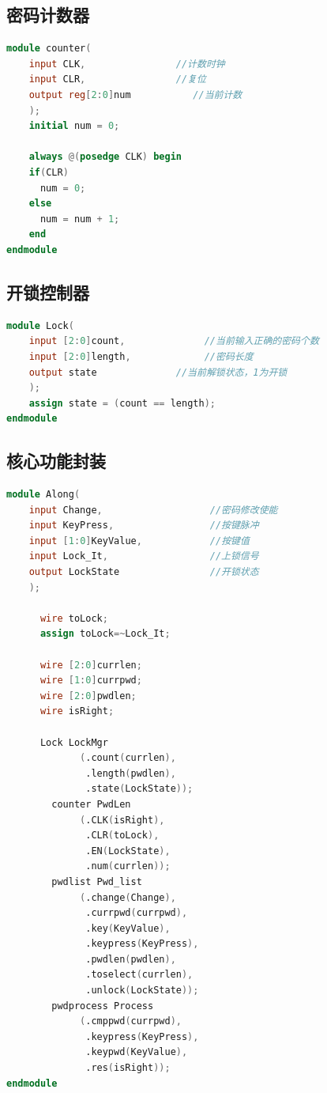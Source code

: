 \documentclass[a4paper,11pt]{ctexart}
\begin{document}
\subsection{密码计数器}
\begin{lstlisting}[language={verilog}]
module counter(
    input CLK,                //计数时钟
    input CLR,                //复位
    output reg[2:0]num           //当前计数
    );
    initial num = 0;

    always @(posedge CLK) begin
    if(CLR)
      num = 0;
    else
      num = num + 1;
    end
endmodule
\end{lstlisting}
\subsection{开锁控制器}
\begin{lstlisting}[language={verilog}]
module Lock(
    input [2:0]count,              //当前输入正确的密码个数
    input [2:0]length,             //密码长度
    output state              //当前解锁状态，1为开锁
    );
    assign state = (count == length);
endmodule
\end{lstlisting}

\subsection{核心功能封装}
\begin{lstlisting}[language={verilog}]
module Along(
    input Change,                   //密码修改使能
    input KeyPress,                 //按键脉冲
    input [1:0]KeyValue,            //按键值
    input Lock_It,                  //上锁信号
    output LockState                //开锁状态
    );

      wire toLock;
      assign toLock=~Lock_It;

      wire [2:0]currlen;
      wire [1:0]currpwd;
      wire [2:0]pwdlen;
      wire isRight;

      Lock LockMgr
             (.count(currlen),
              .length(pwdlen),
              .state(LockState));
        counter PwdLen
             (.CLK(isRight),
              .CLR(toLock),
              .EN(LockState),
              .num(currlen));
        pwdlist Pwd_list
             (.change(Change),
              .currpwd(currpwd),
              .key(KeyValue),
              .keypress(KeyPress),
              .pwdlen(pwdlen),
              .toselect(currlen),
              .unlock(LockState));
        pwdprocess Process
             (.cmppwd(currpwd),
              .keypress(KeyPress),
              .keypwd(KeyValue),
              .res(isRight));
endmodule
\end{lstlisting}
\end{document}
